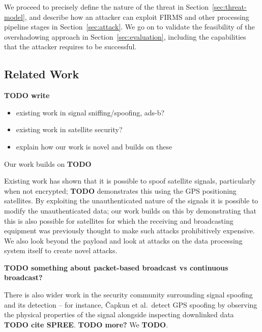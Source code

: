 We proceed to precisely define the nature of the threat in Section~\ref{sec:threat-model}, and describe how an attacker can exploit FIRMS and other processing pipeline stages in Section~\ref{sec:attack}.
We go on to validate the feasibility of the overshadowing approach in Section~\ref{sec:evaluation}, including the capabilities that the attacker requires to be successful.


\subsection{Related Work}

\textbf{TODO write}
\begin{itemize}
    \item existing work in signal sniffing/spoofing, ads-b?
    \item existing work in satellite security?
    \item explain how our work is novel and builds on these
\end{itemize}

Our work builds on \textbf{TODO}

Existing work has shown that it is possible to spoof satellite signals, particularly when not encrypted; \textbf{TODO} demonstrates this using the GPS positioning satellites.
By exploiting the unauthenticated nature of the signals it is possible to modify the unauthenticated data; our work builds on this by demonstrating that this is also possible for satellites for which the receiving and broadcasting equipment was previously thought to make such attacks prohibitively expensive.
We also look beyond the payload and look at attacks on the data processing system itself to create novel attacks.

\textbf{TODO something about packet-based broadcast vs continuous broadcast?}

There is also wider work in the security community surrounding signal spoofing and its detection -- for instance, Čapkun et al.\ detect GPS spoofing by observing the physical properties of the signal alongside inspecting downlinked data \textbf{TODO cite SPREE}.
\textbf{TODO more?}
We \textbf{TODO}.
